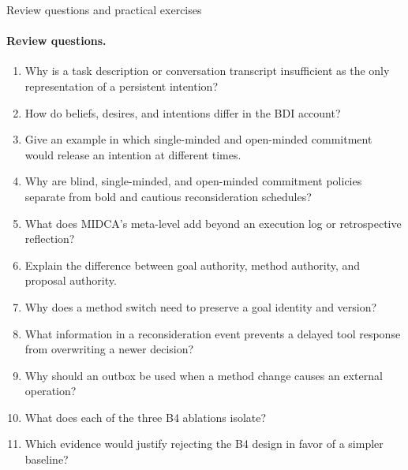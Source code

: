 \begin{reviewquestions}{Review questions and practical exercises}
\paragraph{Review questions.}
\begin{enumerate}
  \item Why is a task description or conversation transcript insufficient as the only representation of a persistent intention?
  \item How do beliefs, desires, and intentions differ in the BDI account?
  \item Give an example in which single-minded and open-minded commitment would release an intention at different times.
  \item Why are blind, single-minded, and open-minded commitment policies separate from bold and cautious reconsideration schedules?
  \item What does MIDCA's meta-level add beyond an execution log or retrospective reflection?
  \item Explain the difference between goal authority, method authority, and proposal authority.
  \item Why does a method switch need to preserve a goal identity and version?
  \item What information in a reconsideration event prevents a delayed tool response from overwriting a newer decision?
  \item Why should an outbox be used when a method change causes an external operation?
  \item What does each of the three B4 ablations isolate?
  \item Which evidence would justify rejecting the B4 design in favor of a simpler baseline?
\end{enumerate}

\end{reviewquestions}
